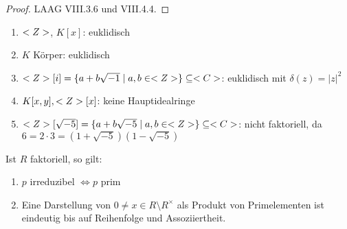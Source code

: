 \begin{proof}
	LAAG VIII.3.6 und VIII.4.4.
\end{proof}

\begin{example}
	\begin{enumerate}[label=(\alph*)]
		\item $<Z>$, $K[x]$: euklidisch
		\item $K$ Körper: euklidisch
		\item $<Z>[i] = \{ a+b\sqrt{-1} \mid a,b \in <Z> \} \subseteq <C>$: euklidisch mit $\delta(z) = \vert z \vert^2$
		\item $K[x,y], <Z>[x]$: keine Hauptidealringe
		\item $<Z>[\sqrt{-5}] = \{ a+b\sqrt{-5} \mid a,b \in <Z> \} \subseteq <C>$: nicht faktoriell, da $6 = 2\cdot 3 = (1 + \sqrt{-5})(1-\sqrt{-5})$
	\end{enumerate}
\end{example}

\begin{remark}
	Ist $R$ faktoriell, so gilt:
	\begin{enumerate}[label=(\alph*)]
		\item $p$ irreduzibel $\Leftrightarrow p$ prim
		\item Eine Darstellung von $0 \neq x \in R \setminus R^{\times}$ als Produkt von Primelementen ist eindeutig bis auf Reihenfolge und Assoziiertheit.
	\end{enumerate}
\end{remark}
